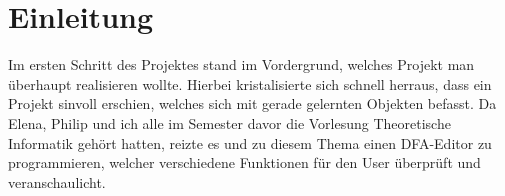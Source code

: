 \chapter{Einleitung}
Im ersten Schritt des Projektes stand im Vordergrund, welches Projekt man überhaupt realisieren wollte. Hierbei kristalisierte sich schnell herraus, dass ein Projekt sinvoll erschien, welches sich mit gerade gelernten Objekten befasst. Da Elena, Philip und ich alle im Semester davor die Vorlesung Theoretische Informatik gehört hatten, reizte es und zu diesem Thema einen DFA-Editor zu programmieren, welcher verschiedene Funktionen für den User überprüft und veranschaulicht. 